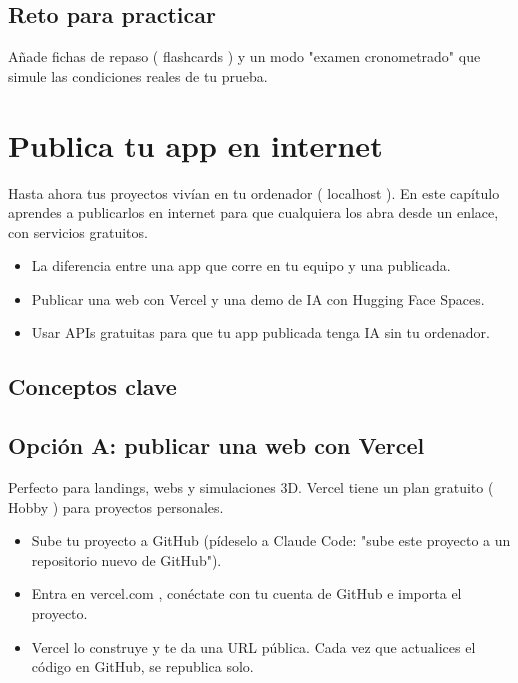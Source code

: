 \documentclass[11pt,a4paper]{book}
\begin{document}
\section{Reto para practicar}
Añade fichas de repaso ( flashcards ) y un modo "examen cronometrado" que simule las condiciones reales de tu prueba.

\chapter{Publica tu app en internet}
Hasta ahora tus proyectos vivían en tu ordenador ( localhost ). En este capítulo aprendes a publicarlos en internet para que cualquiera los abra desde un enlace, con servicios gratuitos.

\begin{itemize}\item La diferencia entre una app que corre en tu equipo y una publicada.\end{itemize}
\begin{itemize}\item Publicar una web con Vercel y una demo de IA con Hugging Face Spaces.\end{itemize}
\begin{itemize}\item Usar APIs gratuitas para que tu app publicada tenga IA sin tu ordenador.\end{itemize}
\section{Conceptos clave}
\section{Opción A: publicar una web con Vercel}
Perfecto para landings, webs y simulaciones 3D. Vercel tiene un plan gratuito ( Hobby ) para proyectos personales.

\begin{itemize}\item Sube tu proyecto a GitHub (pídeselo a Claude Code: "sube este proyecto a un repositorio nuevo de GitHub").\end{itemize}
\begin{itemize}\item Entra en vercel.com , conéctate con tu cuenta de GitHub e importa el proyecto.\end{itemize}
\begin{itemize}\item Vercel lo construye y te da una URL pública. Cada vez que actualices el código en GitHub, se republica solo.\end{itemize}
\end{document}
